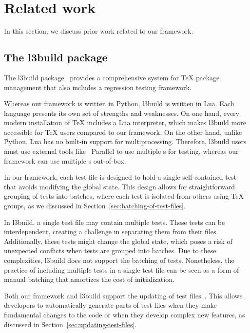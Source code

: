 \documentclass[final]{ltugboat}
\begin{document}
\section{Related work}
\label{sec:related-work}

In this section, we discuss prior work related to our framework.

\subsection{The l3build package}
The l3build package~\cite{mittelbach2014l3build, wright2015automating, wright2022l3build, latex2023l3build} provides a comprehensive system for \TeX{} package management that also includes a regression testing framework.

Whereas our framework is written in Python, l3build is written in Lua. Each language presents its own set of strengths and weaknesses. On one hand, every modern installation of \TeX{} includes a Lua interpreter, which makes l3build more accessible for \TeX{} users compared to our framework. On the other hand, unlike Python, Lua has no built-in support for multiprocessing. Therefore, l3build users must use external tools like ~Parallel to use multiple s for testing, whereas our framework can use multiple s out-of-box.

In our framework, each test file is designed to hold a single self-contained test that avoids modifying the global state. This design allows for straightforward grouping of tests into batches, where each test is isolated from others using \TeX{} groups, as we discussed in Section~\ref{sec:batching-of-test-files}.

In l3build, a single test file may contain multiple tests. These tests can be interdependent, creating a challenge in separating them from their files. Additionally, these tests might change the global state, which poses a risk of unexpected conflicts when tests are grouped into batches. Due to these complexities, l3build does not support the batching of tests. Nonetheless, the practice of including multiple tests in a single test file can be seen as a form of manual batching that amortizes the cost of initialization.

Both our framework and l3build support the updating of test files~\cite[Section~2.7]{latex2023l3build}. This allows developers to automatically generate parts of test files when they make fundamental changes to the code or when they develop complex new features, as discussed in Section~\ref{sec:updating-test-files}.
\end{document}
